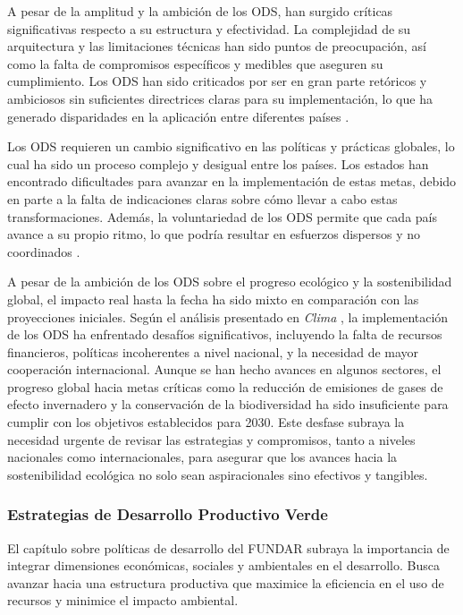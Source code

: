 \documentclass[main.tex]{subfiles}
\begin{document}
A pesar de la amplitud y la ambición de los ODS, han surgido críticas significativas respecto a su estructura y efectividad. La complejidad de su arquitectura y las limitaciones técnicas han sido puntos de preocupación, así como la falta de compromisos específicos y medibles que aseguren su cumplimiento. Los ODS han sido criticados por ser en gran parte retóricos y ambiciosos sin suficientes directrices claras para su implementación, lo que ha generado disparidades en la aplicación entre diferentes países \cite{gil2018objetivos}.

Los ODS requieren un cambio significativo en las políticas y prácticas globales, lo cual ha sido un proceso complejo y desigual entre los países. Los estados han encontrado dificultades para avanzar en la implementación de estas metas, debido en parte a la falta de indicaciones claras sobre cómo llevar a cabo estas transformaciones. Además, la voluntariedad de los ODS permite que cada país avance a su propio ritmo, lo que podría resultar en esfuerzos dispersos y no coordinados \cite{gil2018objetivos}.

A pesar de la ambición de los ODS sobre el progreso ecológico y la sostenibilidad global, el impacto real hasta la fecha ha sido mixto en comparación con las proyecciones iniciales. Según el análisis presentado en \textit{Clima} \cite{clima2022book}, la implementación de los ODS ha enfrentado desafíos significativos, incluyendo la falta de recursos financieros, políticas incoherentes a nivel nacional, y la necesidad de mayor cooperación internacional. Aunque se han hecho avances en algunos sectores, el progreso global hacia metas críticas como la reducción de emisiones de gases de efecto invernadero y la conservación de la biodiversidad ha sido insuficiente para cumplir con los objetivos establecidos para 2030. Este desfase subraya la necesidad urgente de revisar las estrategias y compromisos, tanto a niveles nacionales como internacionales, para asegurar que los avances hacia la sostenibilidad ecológica no solo sean aspiracionales sino efectivos y tangibles.

\subsubsection{Estrategias de Desarrollo Productivo Verde}
El capítulo sobre políticas de desarrollo del FUNDAR subraya la importancia de integrar dimensiones económicas, sociales y ambientales en el desarrollo. Busca avanzar hacia una estructura productiva que maximice la eficiencia en el uso de recursos y minimice el impacto ambiental. 
\end{document}
